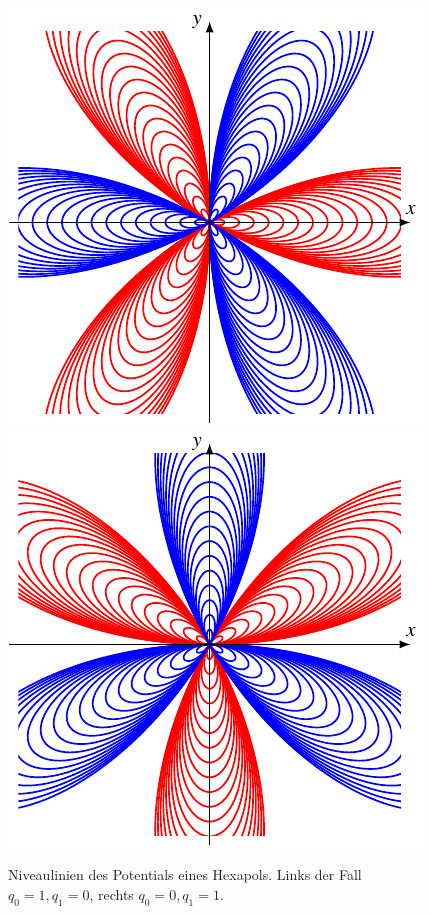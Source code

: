\begin{figure}
\includegraphics{chapters/tikz/hexapol.pdf}
\includegraphics{chapters/tikz/hexapol1.pdf}
\caption{Niveaulinien des Potentials eines Hexapols.
Links der Fall $q_0=1,q_1=0$, rechts $q_0=0,q_1=1$.
\label{chapter:multipol:hexapolniveaux}}
\end{figure}

